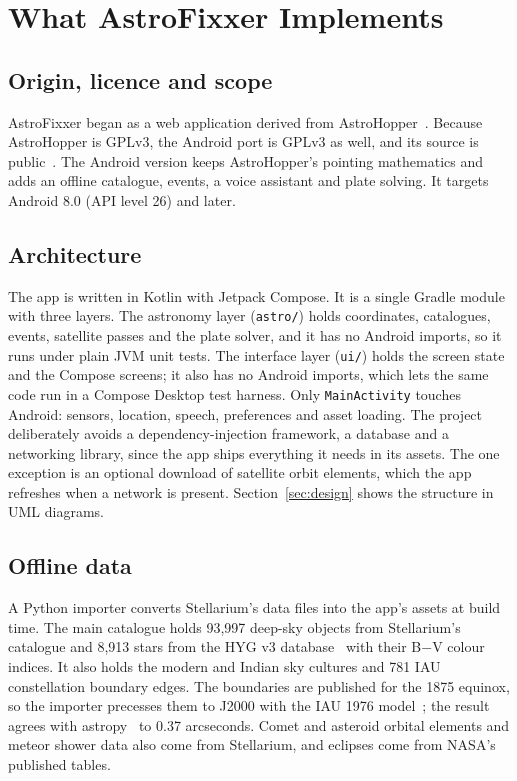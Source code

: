 \section{What AstroFixxer Implements}
\label{sec:system}

\subsection{Origin, licence and scope}

AstroFixxer began as a web application derived from AstroHopper~\cite{astrohopper, astrofixxerweb}. Because AstroHopper is GPLv3, the Android port is GPLv3 as well, and its source is public~\cite{astrofixxerandroid}. The Android version keeps AstroHopper's pointing mathematics and adds an offline catalogue, events, a voice assistant and plate solving. It targets Android 8.0 (API level 26) and later.

\subsection{Architecture}

The app is written in Kotlin with Jetpack Compose. It is a single Gradle module with three layers. The astronomy layer (\texttt{astro/}) holds coordinates, catalogues, events, satellite passes and the plate solver, and it has no Android imports, so it runs under plain JVM unit tests. The interface layer (\texttt{ui/}) holds the screen state and the Compose screens; it also has no Android imports, which lets the same code run in a Compose Desktop test harness. Only \texttt{MainActivity} touches Android: sensors, location, speech, preferences and asset loading. The project deliberately avoids a dependency-injection framework, a database and a networking library, since the app ships everything it needs in its assets. The one exception is an optional download of satellite orbit elements, which the app refreshes when a network is present. Section~\ref{sec:design} shows the structure in UML diagrams.

\subsection{Offline data}
\label{sec:data}

A Python importer converts Stellarium's data files into the app's assets at build time. The main catalogue holds 93,997 deep-sky objects from Stellarium's catalogue and 8,913 stars from the HYG v3 database~\cite{hyg} with their B$-$V colour indices. It also holds the modern and Indian sky cultures and 781 IAU constellation boundary edges. The boundaries are published for the 1875 equinox, so the importer precesses them to J2000 with the IAU 1976 model~\cite{lieske1977}; the result agrees with astropy~\cite{astropy2022} to 0.37 arcseconds. Comet and asteroid orbital elements and meteor shower data also come from Stellarium, and eclipses come from NASA's published tables.


